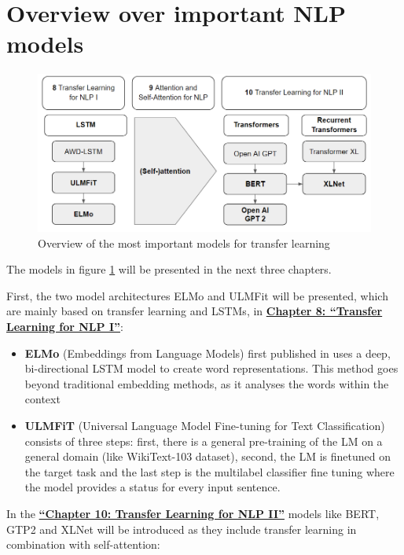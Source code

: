 \documentclass[]{krantz}
\begin{document}
\hypertarget{overview-over-important-nlp-models}{%
\section{Overview over important NLP models}\label{overview-over-important-nlp-models}}

\begin{figure}

{\centering \includegraphics[width=0.7\linewidth]{figures/02-00-transfer-learning-for-nlp/overview-tranferlearning} 

}

\caption{Overview of the most important models for transfer learning}\label{fig:ch02-figure02}
\end{figure}



The models in figure \ref{fig:ch02-figure02} will be presented in the next three chapters.

First, the two model architectures ELMo and ULMFit will be presented, which are mainly based on transfer learning and LSTMs, in \protect\hyperlink{Transfer-Learning-for-NLP-I}{\textbf{Chapter 8: ``Transfer Learning for NLP I''}}:

\begin{itemize}
\item
  \textbf{ELMo} (Embeddings from Language Models) first published in \citet{elmopaper} uses a deep, bi-directional LSTM model to create word representations. This method goes beyond traditional embedding methods, as it analyses the words within the context
\item
  \textbf{ULMFiT} (Universal Language Model Fine-tuning for Text Classification) consists of three steps: first, there is a general pre-training of the LM on a general domain (like WikiText-103 dataset), second, the LM is finetuned on the target task and the last step is the multilabel classifier fine tuning where the model provides a status for every input sentence.
\end{itemize}

In the \protect\hyperlink{Transfer-Learning-for-NLP-II}{\textbf{``Chapter 10: Transfer Learning for NLP II''}} models like BERT, GTP2 and XLNet will be introduced as they include transfer learning in combination with self-attention:
\end{document}

